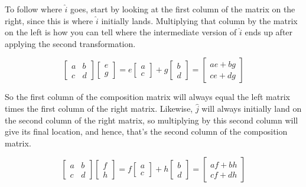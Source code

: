 To follow where $\hat{i}$ goes, start by looking at the first column of the
matrix on the right, since this is where $\hat{i}$ initially lands. Multiplying
that column by the matrix on the left is how you can tell where the intermediate
version of $\hat{i}$ ends up after applying the second transformation.

\begin{equation*}
  \begin{bmatrix}
    a & b \\
    c & d
  \end{bmatrix}
  \begin{bmatrix}
    e \\
    g
  \end{bmatrix} = e
  \begin{bmatrix}
    a \\
    c
  \end{bmatrix} + g
  \begin{bmatrix}
    b \\
    d
  \end{bmatrix} =
  \begin{bmatrix}
    ae + bg \\
    ce + dg
  \end{bmatrix}
\end{equation*}

So the first column of the composition matrix will always equal the left matrix
times the first column of the right matrix. Likewise, $\hat{j}$ will always
initially land on the second column of the right matrix, so multiplying by this
second column will give its final location, and hence, that's the second column
of the composition matrix.

\begin{equation*}
  \begin{bmatrix}
    a & b \\
    c & d
  \end{bmatrix}
  \begin{bmatrix}
    f \\
    h
  \end{bmatrix} = f
  \begin{bmatrix}
    a \\
    c
  \end{bmatrix} + h
  \begin{bmatrix}
    b \\
    d
  \end{bmatrix} =
  \begin{bmatrix}
    af + bh \\
    cf + dh
  \end{bmatrix}
\end{equation*}

